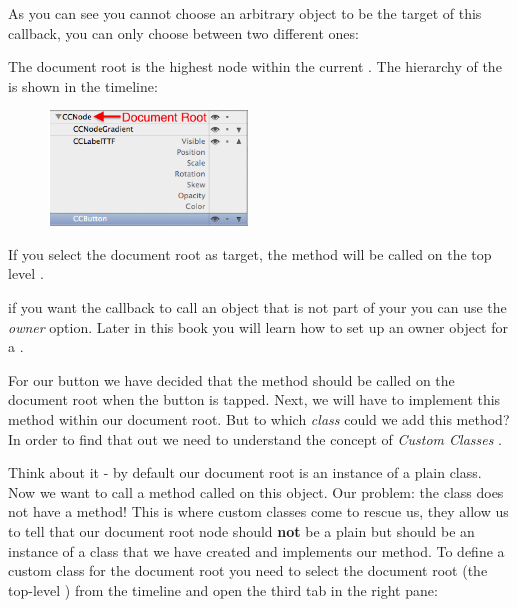 As you can see you cannot choose an arbitrary object to be the target of this
callback, you can only choose between two different ones:
\begin{description}\label{DocumentRoot_Owner}
\item[Document Root] The document root is the highest node
within the current \ccbfile{}. The hierarchy of the \ccbfile{} is shown in the
\SB{} timeline: \begin{figure}[H]
		\centering
		\includegraphics[width=150pt]{images/firstproject/documentroot_node.png}
\end{figure}
If you select the document root as target, the  method
will be called on the top level \ccnode{}. 
\item[Owner] if you want the callback to call an object that is not part of your
\ccbfile{} you can use the \textit{owner} option. Later in this book you will
learn how to set up an owner object for a \ccbfile{}.
\end{description}

For our button we have decided that the  method should be
called on the document root when the button is tapped. Next, we will have to
implement this  method within our document root. But to
which \textit{class} could we add this method? In order to find that out we need to understand the
concept of \textit{Custom Classes} .

Think about it - by default our document root is an instance of a plain
\ccnode{} class.
Now we want to call a method called  on this object. Our
problem: the \ccnode{} class does not have a  method! This
is where custom classes come to rescue us, they allow us to tell \SB{} that our
document root node should \textbf{not} be a plain \ccnode{} but should be an
instance of a class that we have created and implements our
 method. To define a custom class for the document root
you need to select the document root (the top-level \ccnode{}) from the timeline
and open the third tab in the right pane:

